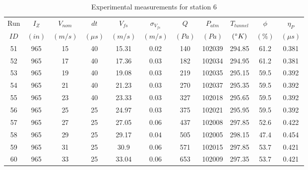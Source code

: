 \begin{table}[H]
\begin{center}
\begin{tabular}{|ccccccccccc|}
	\hline
	Run & $I_Z$ & $V_{nom}$ & $dt$ & $V_{fs}$ & $\sigma_{V_{fs}}$ & $Q$ & $P_{atm}$ & $T_{tunnel}$ & $\phi$ & $\eta_P$\\
	$ID$ & $(in)$ & $(m/s)$ & $(\mu s)$ & $(m/s)$ & $(m/s)$ & $(Pa)$ & $(Pa)$ & $(\degree K)$ & $(\%)$ & $(\mu s)$\\
	\hline
	51 & 965 & 15 & 40 & 15.31 & 0.02 & 140 & 102039 & 294.85 & 61.2 & 0.381\\
	52 & 965 & 17 & 40 & 17.36 & 0.03 & 182 & 102034 & 294.95 & 61.2 & 0.381\\
	53 & 965 & 19 & 40 & 19.08 & 0.03 & 219 & 102035 & 295.15 & 59.5 & 0.392\\
	54 & 965 & 21 & 40 & 21.23 & 0.03 & 270 & 102037 & 295.35 & 59.5 & 0.392\\
	55 & 965 & 23 & 40 & 23.33 & 0.03 & 327 & 102018 & 295.65 & 59.5 & 0.392\\
	56 & 965 & 25 & 25 & 24.97 & 0.03 & 375 & 102021 & 295.95 & 59.5 & 0.392\\
	57 & 965 & 27 & 25 & 27.05 & 0.06 & 437 & 102008 & 297.85 & 52.6 & 0.422\\
	58 & 965 & 29 & 25 & 29.17 & 0.04 & 505 & 102005 & 298.15 & 47.4 & 0.454\\
	59 & 965 & 31 & 25 & 30.9 & 0.06 & 571 & 102015 & 297.85 & 53.7 & 0.421\\
	60 & 965 & 33 & 25 & 33.04 & 0.06 & 653 & 102009 & 297.35 & 53.7 & 0.421\\
	\hline
\end{tabular}
\caption{Experimental measurements for station 6}
\label{table:station_6_measurements}
\end{center}
\end{table}
